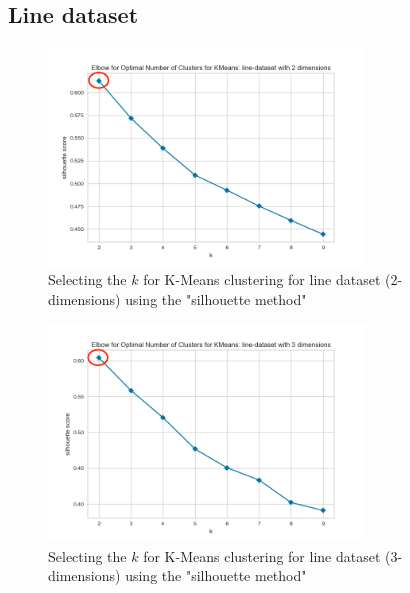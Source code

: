 \subsection{Line dataset}
\begin{figure}[H]
  \includegraphics[width=0.75\textwidth]{Method/images/k-values/line-dataset-2-kmeans.png}
  \caption{Selecting the $k$ for K-Means clustering for line dataset (2-dimensions) using the "silhouette method"}
  \label{hyperparameters:agglomerative-line-dataset-2d}
\end{figure}
\begin{figure}[H]
  \includegraphics[width=0.75\textwidth]{Method/images/k-values/line-dataset-3-kmeans.png}
  \caption{Selecting the $k$ for K-Means clustering for line dataset (3-dimensions) using the "silhouette method"}
  \label{hyperparameters:agglomerative-line-dataset-3d}
\end{figure}
\newpage

